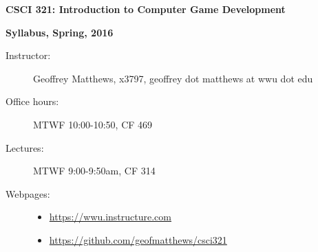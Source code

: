 \documentclass{article}
\begin{document}
\centerline{\Large \bf CSCI 321: Introduction to Computer Game Development}

\centerline{\bf Syllabus,  Spring, 2016}

\begin{description}

\item[Instructor:] Geoffrey Matthews, x3797,
 geoffrey dot matthews at wwu dot edu

\item[Office hours:] MTWF 10:00-10:50, CF 469

\item[Lectures:] MTWF 9:00-9:50am, CF 314


\item [Webpages:] \mbox{}\begin{itemize}
\item\url{https://wwu.instructure.com} 
\item\url{https://github.com/geofmatthews/csci321}
\end{itemize}



\end{description}
\end{document}
